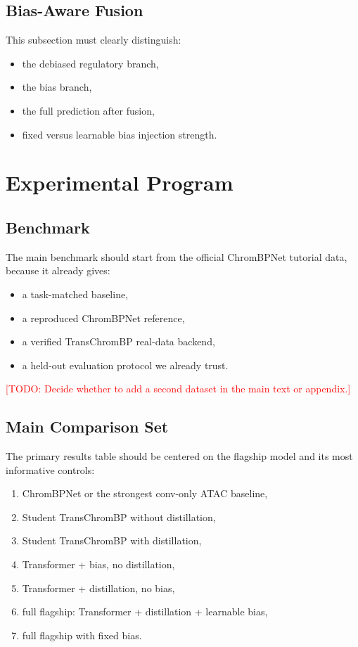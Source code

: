 \documentclass[11pt]{article}
\newcommand{\todo}[1]{\textcolor{red}{[TODO: #1]}}
\begin{document}
\subsection{Bias-Aware Fusion}
This subsection must clearly distinguish:
\begin{itemize}[leftmargin=2em]
  \item the debiased regulatory branch,
  \item the bias branch,
  \item the full prediction after fusion,
  \item fixed versus learnable bias injection strength.
\end{itemize}

\section{Experimental Program}

\subsection{Benchmark}
The main benchmark should start from the official ChromBPNet tutorial data,
because it already gives:
\begin{itemize}[leftmargin=2em]
  \item a task-matched baseline,
  \item a reproduced ChromBPNet reference,
  \item a verified TransChromBP real-data backend,
  \item a held-out evaluation protocol we already trust.
\end{itemize}
\todo{Decide whether to add a second dataset in the main text or appendix.}

\subsection{Main Comparison Set}
The primary results table should be centered on the flagship model and its most
informative controls:
\begin{enumerate}[leftmargin=2em]
  \item ChromBPNet or the strongest conv-only ATAC baseline,
  \item Student TransChromBP without distillation,
  \item Student TransChromBP with distillation,
  \item Transformer + bias, no distillation,
  \item Transformer + distillation, no bias,
  \item full flagship: Transformer + distillation + learnable bias,
  \item full flagship with fixed bias.
\end{enumerate}
\end{document}
